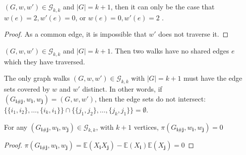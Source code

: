 \begin{lemma}
  \label{lem:one_walk_traverse_twice}
  \notready
    $(G, w, w') \in \mathcal{G}_{k, k}$ and $|G| = k + 1$, then it can only be the case that
    $w(e) = 2, w'(e) = 0$, or $w(e) = 0, w'(e) = 2$ .
\end{lemma}

\begin{proof}
As a common edge, it is impossible that $w'$ does not traverse it.
\end{proof}


\begin{lemma}
  \label{lem:no_shared_edges}
  $(G, w, w') \in \mathcal{G}_{k, k}$ and $|G| = k + 1$. Then two walks have no shared edges $e$ which they have traversed.
\end{lemma}


\begin{lemma}
  \label{lem:disjoint_edge_set}
  \notready
  The only graph walks $(G,w,w')\in \mathcal{G}_{k,k}$ with $|G|=k+1$ must have the edge sets covered by $w$ and $w'$ distinct.
  In other words, if $(G_{\mathbf{i}\#\mathbf{j}},w_\mathbf{i},w_\mathbf{j}) = (G,w,w')$, then the edge sets do not intersect:
  $\{\{i_1,i_2\},\ldots,\{i_k,i_1\}\}\cap\{\{j_1,j_2\},\ldots,\{j_k,j_1\}\}=\emptyset$.
\end{lemma}


\begin{lemma}
  \label{lem:G_leq_k}
  \notready
  For any $(G_{\mathbf{i}\#\mathbf{j}},w_\mathbf{i},w_\mathbf{j}) \in \mathcal{G}_{k,k}$, with
  $k + 1$ vertices, $\pi(G_{\mathbf{i}\#\mathbf{j}},w_\mathbf{i},w_\mathbf{j})  = 0$
\end{lemma}

\begin{proof}
  $\pi(G_{\mathbf{i}\#\mathbf{j}},w_\mathbf{i},w_\mathbf{j}) = \mathbb{E}(X_{\mathbf{i}}X_{\mathbf{j}}) - \mathbb{E}(X_{\mathbf{i}})\mathbb{E}(X_{\mathbf{j}})  = 0$
\end{proof}
